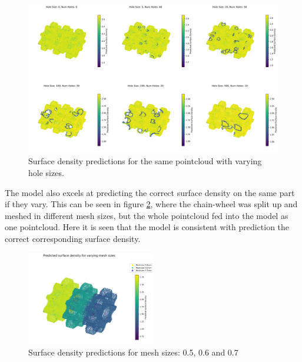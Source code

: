 \begin{figure}[t]
    \centering
    \includegraphics[width=\textwidth]{figures/result3_lowQ.png}
    \caption{Surface density predictions for the same pointcloud with varying hole sizes.}
    \label{fig:holes_predict}
\end{figure}

The model also excels at predicting the correct surface density on the same part if they vary. This can be seen in figure \ref{fig:diff_mesh_predict}, where the chain-wheel was split up and meshed in different mesh sizes, but the whole pointcloud fed into the model as one pointcloud. Here it is seen that the model is consistent with prediction the correct corresponding surface density.


\begin{figure}[H]
    \centering
    \includegraphics[width=0.5\textwidth]{figures/varying_meshsize_lowQ.png}
    \caption{Surface density predictions for mesh sizes: 0.5, 0.6 and 0.7}
    \label{fig:diff_mesh_predict}
\end{figure}
